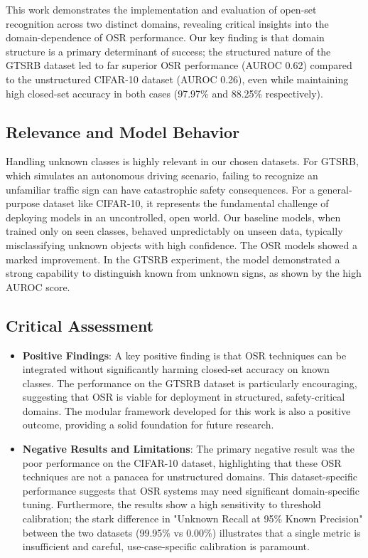 \documentclass[11pt, a4paper]{article}
\begin{document}
This work demonstrates the implementation and evaluation of open-set recognition across two distinct domains, revealing critical insights into the domain-dependence of OSR performance. Our key finding is that domain structure is a primary determinant of success; the structured nature of the GTSRB dataset led to far superior OSR performance (AUROC 0.62) compared to the unstructured CIFAR-10 dataset (AUROC 0.26), even while maintaining high closed-set accuracy in both cases (97.97\% and 88.25\% respectively).

\subsection{Relevance and Model Behavior}
Handling unknown classes is highly relevant in our chosen datasets. For GTSRB, which simulates an autonomous driving scenario, failing to recognize an unfamiliar traffic sign can have catastrophic safety consequences. For a general-purpose dataset like CIFAR-10, it represents the fundamental challenge of deploying models in an uncontrolled, open world. Our baseline models, when trained only on seen classes, behaved unpredictably on unseen data, typically misclassifying unknown objects with high confidence. The OSR models showed a marked improvement. In the GTSRB experiment, the model demonstrated a strong capability to distinguish known from unknown signs, as shown by the high AUROC score.

\subsection{Critical Assessment}
\begin{itemize}
    \item \textbf{Positive Findings}: A key positive finding is that OSR techniques can be integrated without significantly harming closed-set accuracy on known classes. The performance on the GTSRB dataset is particularly encouraging, suggesting that OSR is viable for deployment in structured, safety-critical domains. The modular framework developed for this work is also a positive outcome, providing a solid foundation for future research.
    \item \textbf{Negative Results and Limitations}: The primary negative result was the poor performance on the CIFAR-10 dataset, highlighting that these OSR techniques are not a panacea for unstructured domains. This dataset-specific performance suggests that OSR systems may need significant domain-specific tuning. Furthermore, the results show a high sensitivity to threshold calibration; the stark difference in "Unknown Recall at 95\% Known Precision" between the two datasets (99.95\% vs 0.00\%) illustrates that a single metric is insufficient and careful, use-case-specific calibration is paramount.
\end{itemize}
\end{document}
